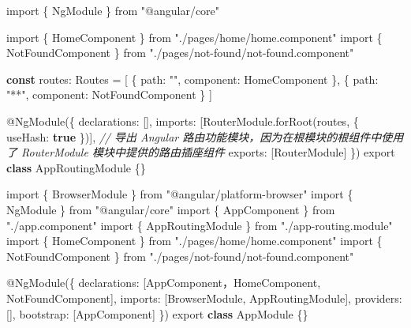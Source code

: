 \documentclass[
]{article}
\newenvironment{Shaded}{}{}
\newcommand{\CommentTok}[1]{\textcolor[rgb]{0.38,0.63,0.69}{\textit{#1}}}
\newcommand{\DataTypeTok}[1]{\textcolor[rgb]{0.56,0.13,0.00}{#1}}
\newcommand{\FunctionTok}[1]{\textcolor[rgb]{0.02,0.16,0.49}{#1}}
\newcommand{\ImportTok}[1]{#1}
\newcommand{\KeywordTok}[1]{\textcolor[rgb]{0.00,0.44,0.13}{\textbf{#1}}}
\newcommand{\NormalTok}[1]{#1}
\newcommand{\OperatorTok}[1]{\textcolor[rgb]{0.40,0.40,0.40}{#1}}
\newcommand{\StringTok}[1]{\textcolor[rgb]{0.25,0.44,0.63}{#1}}
\begin{document}
\begin{Shaded}
\begin{Highlighting}[]
\ImportTok{import}\NormalTok{ \{ NgModule \} }\ImportTok{from} \StringTok{"@angular/core"}

\ImportTok{import}\NormalTok{ \{ HomeComponent \} }\ImportTok{from} \StringTok{"./pages/home/home.component"}
\ImportTok{import}\NormalTok{ \{ NotFoundComponent \} }\ImportTok{from} \StringTok{"./pages/not{-}found/not{-}found.component"}

\KeywordTok{const}\NormalTok{ routes}\OperatorTok{:}\NormalTok{ Routes }\OperatorTok{=}\NormalTok{ [}
\NormalTok{  \{}
    \DataTypeTok{path}\OperatorTok{:} \StringTok{""}\OperatorTok{,}
    \DataTypeTok{component}\OperatorTok{:}\NormalTok{ HomeComponent}
\NormalTok{  \}}\OperatorTok{,}
\NormalTok{  \{}
    \DataTypeTok{path}\OperatorTok{:} \StringTok{"**"}\OperatorTok{,}
    \DataTypeTok{component}\OperatorTok{:}\NormalTok{ NotFoundComponent}
\NormalTok{  \}}
\NormalTok{]}

\NormalTok{@}\FunctionTok{NgModule}\NormalTok{(\{}
  \DataTypeTok{declarations}\OperatorTok{:}\NormalTok{ []}\OperatorTok{,}
  \DataTypeTok{imports}\OperatorTok{:}\NormalTok{ [RouterModule}\OperatorTok{.}\FunctionTok{forRoot}\NormalTok{(routes}\OperatorTok{,}\NormalTok{ \{ }\DataTypeTok{useHash}\OperatorTok{:} \KeywordTok{true}\NormalTok{ \})]}\OperatorTok{,}
  \CommentTok{// 导出 Angular 路由功能模块，因为在根模块的根组件中使用了 RouterModule 模块中提供的路由插座组件}
  \DataTypeTok{exports}\OperatorTok{:}\NormalTok{ [RouterModule]}
\NormalTok{\})}
\ImportTok{export} \KeywordTok{class}\NormalTok{ AppRoutingModule \{\}}
\end{Highlighting}
\end{Shaded}

\begin{Shaded}
\begin{Highlighting}[]
\ImportTok{import}\NormalTok{ \{ BrowserModule \} }\ImportTok{from} \StringTok{"@angular/platform{-}browser"}
\ImportTok{import}\NormalTok{ \{ NgModule \} }\ImportTok{from} \StringTok{"@angular/core"}
\ImportTok{import}\NormalTok{ \{ AppComponent \} }\ImportTok{from} \StringTok{"./app.component"}
\ImportTok{import}\NormalTok{ \{ AppRoutingModule \} }\ImportTok{from} \StringTok{"./app{-}routing.module"}
\ImportTok{import}\NormalTok{ \{ HomeComponent \} }\ImportTok{from} \StringTok{"./pages/home/home.component"}
\ImportTok{import}\NormalTok{ \{ NotFoundComponent \} }\ImportTok{from} \StringTok{"./pages/not{-}found/not{-}found.component"}

\NormalTok{@}\FunctionTok{NgModule}\NormalTok{(\{}
  \DataTypeTok{declarations}\OperatorTok{:}\NormalTok{ [AppComponent，HomeComponent}\OperatorTok{,}\NormalTok{ NotFoundComponent]}\OperatorTok{,}
  \DataTypeTok{imports}\OperatorTok{:}\NormalTok{ [BrowserModule}\OperatorTok{,}\NormalTok{ AppRoutingModule]}\OperatorTok{,}
  \DataTypeTok{providers}\OperatorTok{:}\NormalTok{ []}\OperatorTok{,}
  \DataTypeTok{bootstrap}\OperatorTok{:}\NormalTok{ [AppComponent]}
\NormalTok{\})}
\ImportTok{export} \KeywordTok{class}\NormalTok{ AppModule \{\}}
\end{Highlighting}
\end{Shaded}
\end{document}

